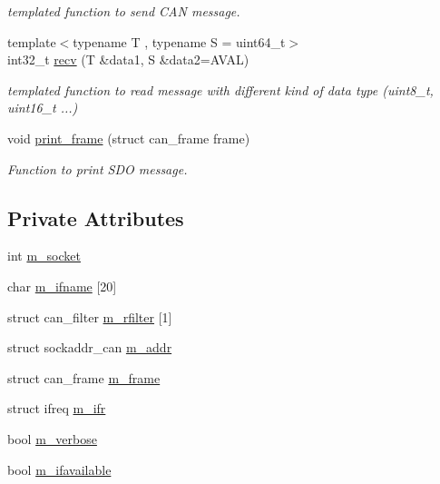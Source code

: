 \begin{DoxyCompactItemize}
\begin{DoxyCompactList}\small\item\em templated function to send C\+AN message. \end{DoxyCompactList}\item 
{\footnotesize template$<$typename T , typename S  = uint64\+\_\+t$>$ }\\int32\+\_\+t \hyperlink{class_canopen__socket_a50f06a4b2c2f43728904cd4b33374cec}{recv} (T \&data1, S \&data2=A\+V\+AL)
\begin{DoxyCompactList}\small\item\em templated function to read message with different kind of data type (uint8\+\_\+t, uint16\+\_\+t ...) \end{DoxyCompactList}\item 
void \hyperlink{class_canopen__socket_a61ae3a827e06354d04f20c224aacf717}{print\+\_\+frame} (struct can\+\_\+frame frame)
\begin{DoxyCompactList}\small\item\em Function to print S\+DO message. \end{DoxyCompactList}\end{DoxyCompactItemize}
\subsection*{Private Attributes}
\begin{DoxyCompactItemize}
\item 
int \hyperlink{class_canopen__socket_acc89d9cb40b8b999b0f376a0c7206394}{m\+\_\+socket}
\item 
char \hyperlink{class_canopen__socket_ad49a1354ba3384f1414f5841a972114e}{m\+\_\+ifname} \mbox{[}20\mbox{]}
\item 
struct can\+\_\+filter \hyperlink{class_canopen__socket_a4f1fd71caed91a115169596d401010c9}{m\+\_\+rfilter} \mbox{[}1\mbox{]}
\item 
struct sockaddr\+\_\+can \hyperlink{class_canopen__socket_a5a97bd26a92fb94c9a662e30c7d4a490}{m\+\_\+addr}
\item 
struct can\+\_\+frame \hyperlink{class_canopen__socket_a3ef799f7984741623f0ccf5cfd0c6c24}{m\+\_\+frame}
\item 
struct ifreq \hyperlink{class_canopen__socket_a7d62a0470dce8d1d7d45dbc956c2226a}{m\+\_\+ifr}
\item 
bool \hyperlink{class_canopen__socket_acac0d3984deafb27f4d6a2f96005c6b9}{m\+\_\+verbose}
\item 
bool \hyperlink{class_canopen__socket_a117c72a5f32b1155c74d9435abdde88f}{m\+\_\+ifavailable}
\end{DoxyCompactItemize}


